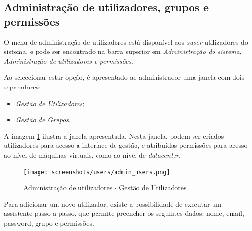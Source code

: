 \subsection{Administração de utilizadores, grupos e permissões}
O menu de administração de utilizadores está disponível aos \textit{super} utilizadores do sistema, e pode ser encontrado na barra superior em \textit{Administração do sistema}, \textit{Administração de utilizadores e permissões}.

Ao seleccionar estar opção, é apresentado ao administrador uma janela com dois separadores:  
\begin{itemize}
	\item \textit{Gestão de Utilizadores};
	\item \textit{Gestão de Grupos}.
\end{itemize}

A imagem \ref{fig:admin_users} ilustra a janela apresentada. Nesta janela, podem ser criados utilizadores para acesso à interface de gestão, e atribuídas permissões para acesso ao nível de máquinas virtuais, como ao nível de \textit{datacenter}.

\begin{figure}[H]
        \begin{center}
        \texttt{[image: screenshots/users/admin\_users.png]}
        \caption{Administração de utilizadores - Gestão de Utilizadores}
        \label{fig:admin_users}
        \end{center}
\end{figure}

Para adicionar um novo utilizador, existe a possibilidade de executar um assistente passo a passo, que permite preencher os seguintes dados: nome, email, password, grupo e permissões.

